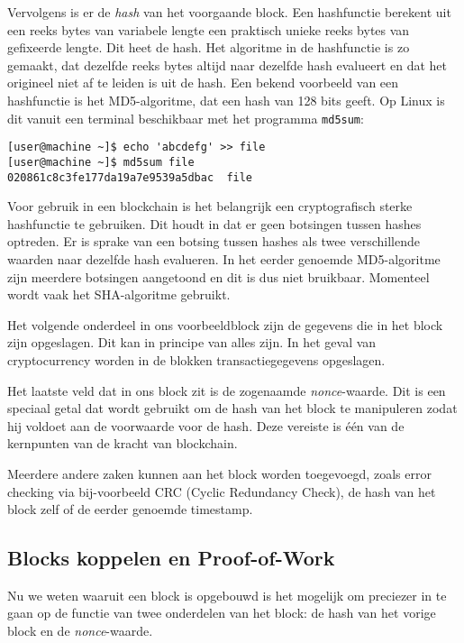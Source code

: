 \documentclass{article}
\begin{document}
Vervolgens is er de \textit{hash} van het voorgaande block. Een hashfunctie berekent uit een reeks bytes van variabele lengte een praktisch unieke reeks bytes van gefixeerde lengte. Dit heet de hash. Het algoritme in de hashfunctie is zo gemaakt, dat dezelfde reeks bytes altijd naar dezelfde hash evalueert en dat het origineel niet af te leiden is uit de hash. Een bekend voorbeeld van een hashfunctie is het MD5-algoritme, dat een hash van 128 bits geeft. Op Linux is dit vanuit een terminal beschikbaar met het programma \texttt{md5sum}:
\begin{verbatim} 
[user@machine ~]$ echo 'abcdefg' >> file
[user@machine ~]$ md5sum file
020861c8c3fe177da19a7e9539a5dbac  file
\end{verbatim}
Voor gebruik in een blockchain is het belangrijk een cryptografisch sterke hashfunctie te gebruiken. Dit houdt in dat er geen botsingen tussen hashes optreden. Er is sprake van een botsing tussen hashes als twee verschillende waarden naar dezelfde hash evalueren. In het eerder genoemde MD5-algoritme zijn meerdere botsingen aangetoond en dit is dus niet bruikbaar. Momenteel wordt vaak het SHA-algoritme gebruikt.

Het volgende onderdeel in ons voorbeeldblock zijn de gegevens die in het block zijn opgeslagen. Dit kan in principe van alles zijn. In het geval van cryptocurrency worden in de blokken transactiegegevens opgeslagen.

Het laatste veld dat in ons block zit is de zogenaamde \textit{nonce}-waarde. Dit is een speciaal getal dat wordt gebruikt om de hash van het block te manipuleren zodat hij voldoet aan de voorwaarde voor de hash. Deze vereiste is één van de kernpunten van de kracht van blockchain.

Meerdere andere zaken kunnen aan het block worden toegevoegd, zoals error checking via bij-voorbeeld CRC (Cyclic Redundancy Check), de hash van het block zelf of de eerder genoemde timestamp.

\subsection{Blocks koppelen en Proof-of-Work}
Nu we weten waaruit een block is opgebouwd is het mogelijk om preciezer in te gaan op de functie van twee onderdelen van het block: de hash van het vorige block en de \textit{nonce}-waarde.
\end{document}

